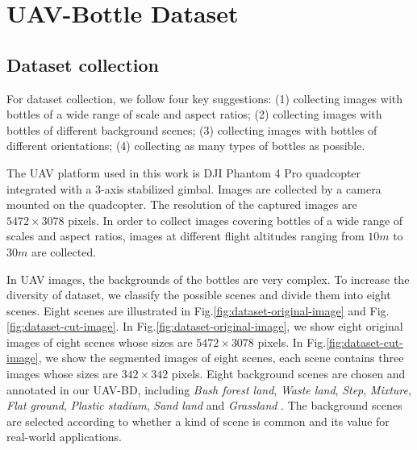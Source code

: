 \section{UAV-Bottle Dataset}
\label{sec:dataset}


\subsection{Dataset collection}
\label{ssec:image_collection}


For dataset collection, we follow four key suggestions: (1) collecting images with bottles of a wide range of scale and aspect ratios; (2) collecting images with bottles of different background scenes; (3) collecting images with bottles of different orientations; (4) collecting as many types of bottles as possible.

The UAV platform used in this work is DJI Phantom 4 Pro quadcopter integrated with a 3-axis stabilized gimbal. Images are collected by a camera mounted on the quadcopter. The resolution of the captured images are $ 5472\times 3078 $ pixels. In order to collect images covering bottles of a wide range of scales and aspect ratios, images at different flight altitudes ranging from $ 10m $ to $ 30m $ are collected.

In UAV images, the backgrounds of the bottles are very complex. To increase the diversity of dataset, we classify the possible scenes and divide them into eight scenes. Eight scenes are illustrated in Fig.\ref{fig:dataset-original-image} and Fig.\ref{fig:dataset-cut-image}. In Fig.\ref{fig:dataset-original-image}, we show eight original images of eight scenes whose sizes are $ 5472\times 3078 $ pixels. In Fig.\ref{fig:dataset-cut-image}, we show the segmented images of eight scenes, each scene contains three images whose sizes are $ 342 \times 342 $ pixels. Eight background scenes are chosen and annotated in our UAV-BD, including \textit{Bush forest land}, \textit{Waste land}, \textit{Step}, \textit{Mixture}, \textit{Flat ground}, \textit{Plastic stadium}, \textit{Sand land} and \textit{Grassland} . The background scenes are selected according to whether a kind of scene is common and its value for real-world applications.



